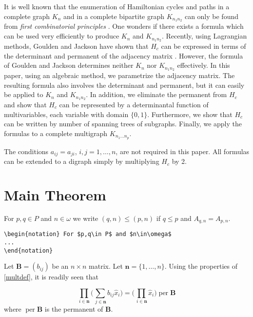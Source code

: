 \documentclass[mlq,fleqn]{w-art}
\DeclareMathOperator{\per}{per}
\begin{document}
It is well known that the enumeration of Hamiltonian cycles and paths in
a complete graph $K_n$ and in a complete bipartite graph $K_{n_1n_2}$
can only be found from \textit{first combinatorial principles}
\cite{hapa:graphenum}. One wonders if there exists a formula which can
be used very efficiently to produce $K_n$ and $K_{n_1n_2}$. Recently,
using Lagrangian methods, Goulden and Jackson have shown that $H_c$ can
be expressed in terms of the determinant and permanent of the adjacency
matrix \cite{gouja:lagrmeth}. However, the formula of Goulden and
Jackson determines neither $K_n$ nor $K_{n_1n_2}$ effectively. In this
paper, using an algebraic method, we parametrize the adjacency matrix.
The resulting formula also involves the determinant and permanent, but
it can easily be applied to $K_n$ and $K_{n_1n_2}$. In addition, we
eliminate the permanent from $H_c$ and show that $H_c$ can be
represented by a determinantal function of multivariables, each variable
with domain $\{0,1\}$. Furthermore, we show that $H_c$ can be written by
number of spanning trees of subgraphs. Finally, we apply the formulas to
a complete multigraph $K_{n_1\dots n_p}$.

The conditions $a_{ij}=a_{ji}$, $i,j=1,\dots,n$, are not required in
this paper. All formulas can be extended to a digraph simply by
multiplying $H_c$ by 2.

\section{Main Theorem}
\label{s:mt}

\begin{notation} For $p,q\in P$ and $n\in\omega$ we write
$(q,n)\le(p,n)$ if $q\le p$ and $A_{q,n}=A_{p,n}$.
\begin{verbatim}
\begin{notation} For $p,q\in P$ and $n\in\omega$
...
\end{notation}
\end{verbatim}
\end{notation}

Let $\mathbf{B}=(b_{ij})$ be an $n\times n$ matrix. Let $\mathbf{n}=\{1,
\dots,n\}$. Using the properties of \eqref{multdef}, it is readily seen
that

\begin{lem}\label{lem-per}
\begin{equation}
\prod_{i\in\mathbf{n}}
\biggl(\sum_{\,j\in\mathbf{n}}b_{ij}\hat x_i\biggr)
=\biggl(\prod_{\,i\in\mathbf{n}}\hat x_i\biggr)\per \mathbf{B}
\end{equation}
where $\per \mathbf{B}$ is the permanent of $\mathbf{B}$.
\end{lem}
\end{document}
